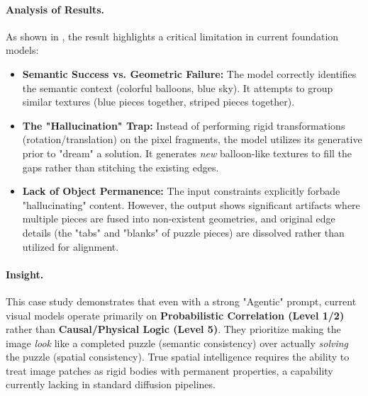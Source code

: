\paragraph{Analysis of Results.}
As shown in , the result highlights a critical limitation in current foundation models:
\begin{itemize}
    \item \textbf{Semantic Success vs. Geometric Failure:} The model correctly identifies the semantic context (colorful balloons, blue sky). It attempts to group similar textures (blue pieces together, striped pieces together).
    \item \textbf{The "Hallucination" Trap:} Instead of performing rigid transformations (rotation/translation) on the pixel fragments, the model utilizes its generative prior to "dream" a solution. It generates \textit{new} balloon-like textures to fill the gaps rather than stitching the existing edges.
    \item \textbf{Lack of Object Permanence:} The input constraints explicitly forbade "hallucinating" content. However, the output shows significant artifacts where multiple pieces are fused into non-existent geometries, and original edge details (the "tabs" and "blanks" of puzzle pieces) are dissolved rather than utilized for alignment.
\end{itemize}

\paragraph{Insight.}
This case study demonstrates that even with a strong "Agentic" prompt, current visual models operate primarily on \textbf{Probabilistic Correlation (Level 1/2)} rather than \textbf{Causal/Physical Logic (Level 5)}. They prioritize making the image \textit{look} like a completed puzzle (semantic consistency) over actually \textit{solving} the puzzle (spatial consistency). True spatial intelligence requires the ability to treat image patches as rigid bodies with permanent properties, a capability currently lacking in standard diffusion pipelines.

